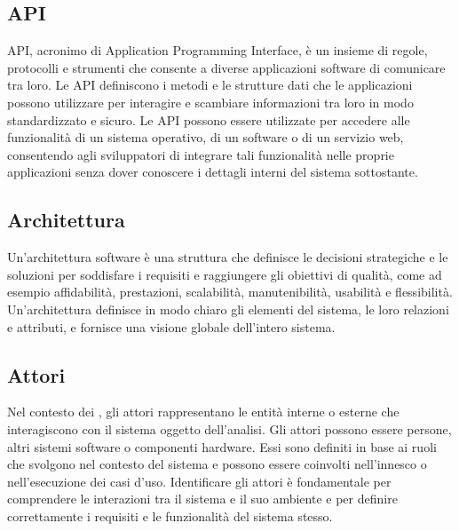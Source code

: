 \vspace{2em}
\subsection*{API}
API, acronimo di Application Programming Interface, è un insieme di regole, protocolli e strumenti che consente a diverse applicazioni software di comunicare tra loro. Le API definiscono i metodi e le strutture dati che le applicazioni possono utilizzare per interagire e scambiare informazioni tra loro in modo standardizzato e sicuro. Le API possono essere utilizzate per accedere alle funzionalità di un sistema operativo, di un software o di un servizio web, consentendo agli sviluppatori di integrare tali funzionalità nelle proprie applicazioni senza dover conoscere i dettagli interni del sistema sottostante.

\vspace{2em}
\subsection*{Architettura}
Un'architettura software è una struttura che definisce le decisioni strategiche e le soluzioni per soddisfare i requisiti e raggiungere gli obiettivi di qualità, come ad esempio affidabilità, prestazioni, scalabilità, manutenibilità, usabilità e flessibilità. Un'architettura definisce in modo chiaro gli elementi del sistema, le loro relazioni e attributi, e fornisce una visione globale dell'intero sistema.

\vspace{2em}
\subsection*{Attori}
Nel contesto dei , gli attori rappresentano le entità interne o esterne che interagiscono con il sistema oggetto dell'analisi. Gli attori possono essere persone, altri sistemi software o componenti hardware. Essi sono definiti in base ai ruoli che svolgono nel contesto del sistema e possono essere coinvolti nell'innesco o nell'esecuzione dei casi d'uso. Identificare gli attori è fondamentale per comprendere le interazioni tra il sistema e il suo ambiente e per definire correttamente i requisiti e le funzionalità del sistema stesso.
